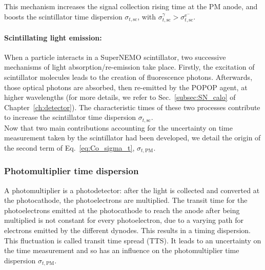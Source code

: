 This mechanism increases the signal collection rising time at the PM anode, and boosts the scintillator time dispersion $\sigma_{t,\text{sc}}$, with $\sigma_{t,\text{sc}}^{\gamma}>\sigma_{t,\text{sc}}^{\text{e}^{-}}$.

\paragraph{Scintillating light emission:}
When a particle interacts in a SuperNEMO scintillator, two successive mechanisms of light absorption/re-emission take place.
Firstly, the excitation of scintillator molecules leads to the creation of fluorescence photons.
Afterwards, those optical photons are absorbed, then re-emitted by the POPOP agent, at higher wavelengths (for more details, we refer to Sec.~\ref{subsec:SN_calo} of Chapter~\ref{ch:detector}).
The characteristic times of these two processes contribute to increase the scintillator time dispersion $\sigma_{t,\text{sc}}$.\\

Now that two main contributions accounting for the uncertainty on time measurement taken by the scintillator had been developed, we detail the origin of the second term of Eq.~\eqref{eq:Co_sigma_t}, $\sigma_{t,\text{PM}}$.

\subsubsection*{Photomultiplier time dispersion}

A photomultiplier is a photodetector: after the light is collected and converted at the photocathode, the photoelectrons are multiplied.
The transit time for the photoelectrons emitted at the photocathode to reach the anode after being multiplied is not constant for every photoelectron, due to a varying path for electrons emitted by the different dynodes.
This results in a timing dispersion.
This fluctuation is called transit time spread (TTS).
It leads to an uncertainty on the time measurement and so has an influence on the photomultiplier time dispersion $\sigma_{t,\text{PM}}$.\\

